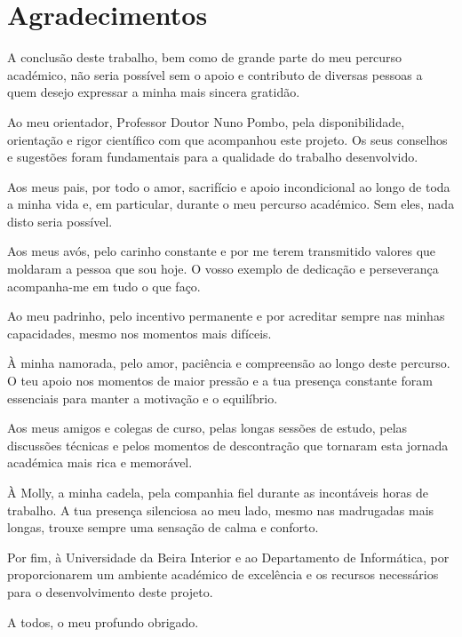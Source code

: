 \chapter*{Agradecimentos}

A conclusão deste trabalho, bem como de grande parte do meu percurso académico, não seria possível sem o apoio e contributo de diversas pessoas a quem desejo expressar a minha mais sincera gratidão.

Ao meu orientador, Professor Doutor Nuno Pombo, pela disponibilidade, orientação e rigor científico com que acompanhou este projeto. Os seus conselhos e sugestões foram fundamentais para a qualidade do trabalho desenvolvido.

Aos meus pais, por todo o amor, sacrifício e apoio incondicional ao longo de toda a minha vida e, em particular, durante o meu percurso académico. Sem eles, nada disto seria possível.

Aos meus avós, pelo carinho constante e por me terem transmitido valores que moldaram a pessoa que sou hoje. O vosso exemplo de dedicação e perseverança acompanha-me em tudo o que faço.

Ao meu padrinho, pelo incentivo permanente e por acreditar sempre nas minhas capacidades, mesmo nos momentos mais difíceis.

À minha namorada, pelo amor, paciência e compreensão ao longo deste percurso. O teu apoio nos momentos de maior pressão e a tua presença constante foram essenciais para manter a motivação e o equilíbrio.

Aos meus amigos e colegas de curso, pelas longas sessões de estudo, pelas discussões técnicas e pelos momentos de descontração que tornaram esta jornada académica mais rica e memorável.

À Molly, a minha cadela, pela companhia fiel durante as incontáveis horas de trabalho. A tua presença silenciosa ao meu lado, mesmo nas madrugadas mais longas, trouxe sempre uma sensação de calma e conforto.

Por fim, à Universidade da Beira Interior e ao Departamento de Informática, por proporcionarem um ambiente académico de excelência e os recursos necessários para o desenvolvimento deste projeto.

A todos, o meu profundo obrigado.
